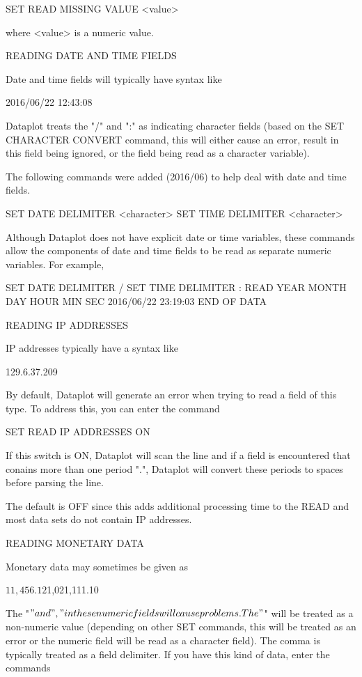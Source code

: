     SET READ MISSING VALUE  <value>

where <value> is a numeric value.

READING DATE AND TIME FIELDS

Date and time fields will typically have syntax like

   2016/06/22
   12:43:08

Dataplot treats the "/" and ":" as indicating character fields
(based on the SET CHARACTER CONVERT command, this will either cause
an error, result in this field being ignored, or the field being
read as a character variable).

The following commands were added (2016/06) to help deal with date and
time fields.

   SET DATE DELIMITER <character>
   SET TIME DELIMITER <character>

Although Dataplot does not have explicit date or time variables,
these commands allow the components of date and time fields to
be read as separate numeric variables.  For example,

   SET DATE DELIMITER /
   SET TIME DELIMITER :
   READ YEAR MONTH DAY HOUR MIN SEC
   2016/06/22  23:19:03
   END OF DATA

READING IP ADDRESSES

IP addresses typically have a syntax like

   129.6.37.209

By default, Dataplot will generate an error when trying to read a
field of this type.  To address this, you can enter the command

   SET READ IP ADDRESSES ON

If this switch is ON, Dataplot will scan the line and if a field is
encountered that conains more than one period ".", Dataplot will
convert these periods to spaces before parsing the line.

The default is OFF since this adds additional processing time to
the READ and most data sets do not contain IP addresses.

READING MONETARY DATA

Monetary data may sometimes be given as

   $11,456.12  $1,021,111.10

The "$" and "," in these numeric fields will cause problems.  The
"$" will be treated as a non-numeric value (depending on other
SET commands, this will be treated as an error or the numeric field
will be read as a character field).  The comma is typically treated
as a field delimiter.  If you have this kind of data, enter the
commands

